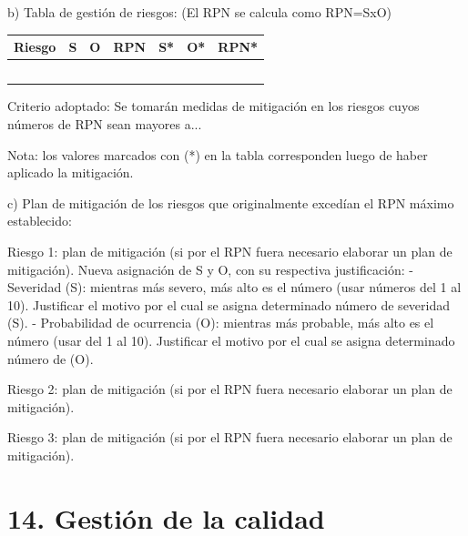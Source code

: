 \documentclass[
11pt, %
]{charter}
\begin{document}
b) Tabla de gestión de riesgos:      (El RPN se calcula como RPN=SxO)

\begin{table}[htpb]
\centering
\begin{tabularx}{\linewidth}{@{}|X|c|c|c|c|c|c|@{}}
\hline
\rowcolor[HTML]{C0C0C0} 
Riesgo & S & O & RPN & S* & O* & RPN* \\ \hline
       &   &   &     &    &    &      \\ \hline
       &   &   &     &    &    &      \\ \hline
       &   &   &     &    &    &      \\ \hline
       &   &   &     &    &    &      \\ \hline
       &   &   &     &    &    &      \\ \hline
\end{tabularx}%
\end{table}

Criterio adoptado: 
Se tomarán medidas de mitigación en los riesgos cuyos números de RPN sean mayores a...

Nota: los valores marcados con (*) en la tabla corresponden luego de haber aplicado la mitigación.

c) Plan de mitigación de los riesgos que originalmente excedían el RPN máximo establecido:
 
Riesgo 1: plan de mitigación (si por el RPN fuera necesario elaborar un plan de mitigación).
  Nueva asignación de S y O, con su respectiva justificación:
  - Severidad (S): mientras más severo, más alto es el número (usar números del 1 al 10).
          Justificar el motivo por el cual se asigna determinado número de severidad (S).
  - Probabilidad de ocurrencia (O): mientras más probable, más alto es el número (usar del 1 al 10).
          Justificar el motivo por el cual se asigna determinado número de (O).

Riesgo 2: plan de mitigación (si por el RPN fuera necesario elaborar un plan de mitigación).
 
Riesgo 3: plan de mitigación (si por el RPN fuera necesario elaborar un plan de mitigación).



\section{14. Gestión de la calidad}
\label{sec:calidad}
\end{document}
